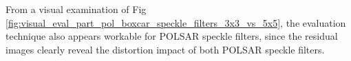 \documentclass[journal]{IEEEtran}
\begin{document}

From a visual examination of Fig \ref{fig:visual_eval_part_pol_boxcar_speckle_filters_3x3_vs_5x5}, the evaluation technique also appears workable for POLSAR speckle filters, since the residual images clearly reveal the distortion impact of both POLSAR speckle filters.

%
\end{document}
